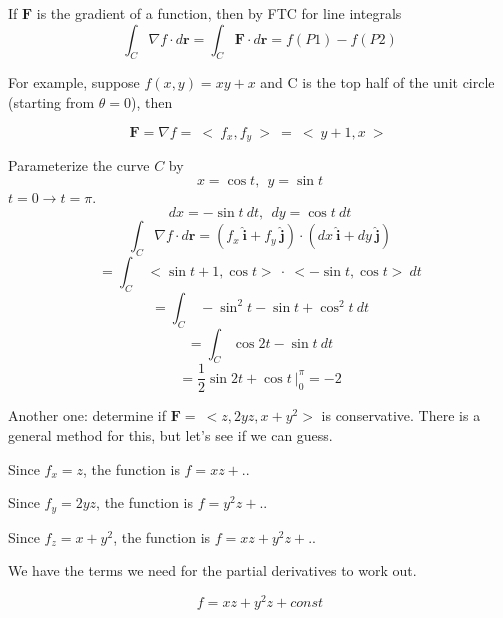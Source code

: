 \documentclass[11pt, oneside]{article}   	%
\begin{document}
If $\mathbf{F}$ is the gradient of a function, then by FTC for line integrals
 \[ \int_C \nabla f \cdot d \mathbf{r} = \int_C \mathbf{F} \cdot d \mathbf{r} =    f(P1) - f(P2) \]
 
For example, suppose $f(x,y) = xy + x$ and C is the top half of the unit circle (starting from $\theta=0$), then

\[ \mathbf{F} = \nabla f = \ < \ f_x, f_y \ > \  = \ < \ y+1,x \ > \ \]

Parameterize the curve $C$ by 
\[ x=\cos t, \ \ y = \sin t \]
$ t = 0 \rightarrow t = \pi$.
 \[ dx = - \sin t \ dt, \ \ dy = \cos t \ dt \]
 \[ \int_C \nabla f \cdot d \mathbf{r} = (f_x \ \hat{\mathbf{i}} + f_y \ \hat{\mathbf{j}}) \cdot (dx \ \hat{\mathbf{i}} + dy \ \hat{\mathbf{j}} ) \]
 \[= \int_C \ < \sin t + 1, \cos t > \  \cdot \ < -\sin t , \cos t> \ dt \]
 \[ = \int_C \ - \sin^2 t - \sin t + \cos^2 t \ dt \]
 \[ = \int_C \cos 2t - \sin t \ dt \]
\[ = \frac{1}{2} \sin 2t + \cos t   \ \bigg|_0^{\pi} = -2 \]

Another one:  determine if $\mathbf{F} = \ <z,2yz,x+y^2>$ is conservative.  There is a general method for this, but let's see if we can guess.

Since $f_x = z$, the function is $f = xz + ..$

Since $f_y = 2yz$, the function is $f = y^2z + ..$

Since $f_z = x + y^2$, the function is $f = xz + y^2z + ..$

We have the terms we need for the partial derivatives to work out.  

\[ f = xz + y^2z + const \]
\end{document}
